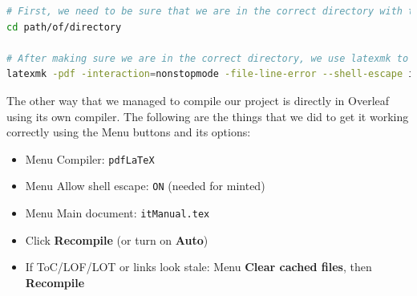 \begin{lstlisting}[style=linuxstyle, language=bash]
# First, we need to be sure that we are in the correct directory with the use of cd.
cd path/of/directory

# After making sure we are in the correct directory, we use latexmk to put multiple other commands into one simple one.
latexmk -pdf -interaction=nonstopmode -file-line-error --shell-escape itManual.tex
\end{lstlisting}

The other way that we managed to compile our project is directly in Overleaf using its own compiler. The following are the things that we did to get it working correctly using the Menu buttons and its options:

\begin{itemize}[leftmargin=*]
  \item Menu \textrightarrow{} Compiler: \texttt{pdfLaTeX}
  \item Menu \textrightarrow{} Allow shell escape: \texttt{ON} (needed for minted)
  \item Menu \textrightarrow{} Main document: \texttt{itManual.tex}
  \item Click \textbf{Recompile} (or turn on \textbf{Auto})
  \item If ToC/LOF/LOT or links look stale: Menu \textrightarrow{} \textbf{Clear cached files}, then \textbf{Recompile}
\end{itemize}
